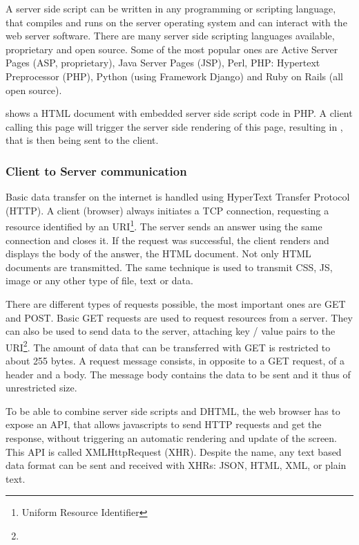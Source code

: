 A server side script can be written in any programming or scripting language, that compiles and runs on the server operating system and can interact with the web server software.
There are many server side scripting languages available, proprietary and open source.
Some of the most popular ones are Active Server Pages (ASP, proprietary), Java Server Pages (JSP), Perl, PHP: Hypertext Preprocessor (PHP), Python (using Framework Django) and Ruby on Rails (all open source).

 shows a HTML document with embedded server side script code in PHP.
A client calling this page will trigger the server side rendering of this page, resulting in , that is then being sent to the client.



\subsubsection{Client to Server communication}
\label{sec:servercom}

Basic data transfer on the internet is handled using HyperText Transfer Protocol (HTTP).
A client (browser) always initiates a TCP connection, requesting a resource identified by an URI\footnote{Uniform Resource Identifier}.
The server sends an answer using the same connection and closes it.
If the request was successful, the client renders and displays the body of the answer, the HTML document. Not only HTML documents are transmitted. The same technique is used to transmit CSS, JS, image or any other type of file, text or data.

There are different types of requests possible, the most important ones are GET and POST.
Basic GET requests are used to request resources from a server.
They can also be used to send data to the server, attaching key / value pairs to the URI\footnote{}. The amount of data that can be transferred with GET is restricted to about 255 bytes.
A  request message consists, in opposite to a GET request, of a header and a body.
The message body contains the data to be sent and it thus of unrestricted size.

To be able to combine server side scripts and DHTML, the web browser has to expose an API, that allows javascripts to send HTTP requests and get the response, without triggering an automatic rendering and update of the screen.
This API is called XMLHttpRequest (XHR). Despite the name, any text based data format can be sent and received with XHRs: JSON, HTML, XML, or plain text.

